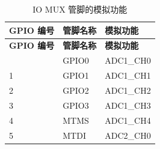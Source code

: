    \begin{longtable}[c]{|p{2cm}|p{2.5cm}|p{3cm}| }
   \caption{IO MUX 管脚的模拟功能}
    \label{tab:iomuxgpio-iomax-pins-analog-functions} \\
        \hline
        \rowcolor{lightgray}
        \textbf{GPIO 编号} & \textbf{管脚名称}  & \textbf{模拟功能} \\
        \hline
        \endfirsthead
        \hline
        \rowcolor{lightgray}
        \textbf{GPIO 编号} & \textbf{管脚名称} & \textbf{模拟功能 } \\
        \hline
        \endhead
        \endfoot
 0 & GPIO0    & ADC1\_CH0                  \\
\hline
 1 & GPIO1    & ADC1\_CH1                 \\
\hline
 2 & GPIO2               & ADC1\_CH2                 \\
\hline
 3 & GPIO3               & ADC1\_CH3                 \\
\hline
4 & MTMS               & ADC1\_CH4                  \\\hline
 5 & MTDI               & ADC2\_CH0                 \\
\hline


\end{longtable}
